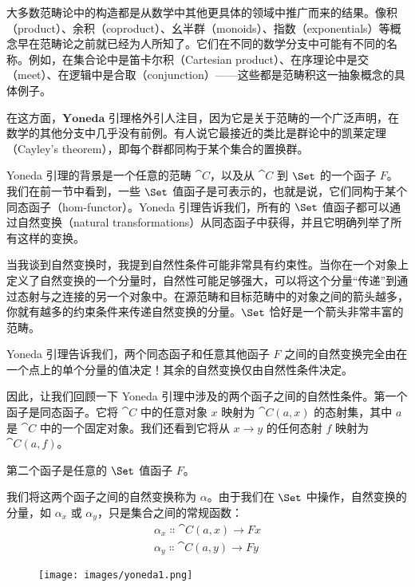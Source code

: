 
\lettrine[lhang=0.17]{大}{多数范畴论中的构造}都是从数学中其他更具体的领域中推广而来的结果。像积（product）、余积（coproduct）、幺半群（monoids）、指数（exponentials）等概念早在范畴论之前就已经为人所知了。它们在不同的数学分支中可能有不同的名称。例如，在集合论中是笛卡尔积（Cartesian product）、在序理论中是交（meet）、在逻辑中是合取（conjunction）——这些都是范畴积这一抽象概念的具体例子。

在这方面，$\textbf{Yoneda 引理}$格外引人注目，因为它是关于范畴的一个广泛声明，在数学的其他分支中几乎没有前例。有人说它最接近的类比是群论中的凯莱定理（Cayley’s theorem），即每个群都同构于某个集合的置换群。

Yoneda 引理的背景是一个任意的范畴 $\cat{C}$，以及从 $\cat{C}$ 到 $\Set$ 的一个函子 $F$。我们在前一节中看到，一些 $\Set$ 值函子是可表示的，也就是说，它们同构于某个同态函子（hom-functor）。Yoneda 引理告诉我们，所有的 $\Set$ 值函子都可以通过自然变换（natural transformations）从同态函子中获得，并且它明确列举了所有这样的变换。

当我谈到自然变换时，我提到自然性条件可能非常具有约束性。当你在一个对象上定义了自然变换的一个分量时，自然性可能足够强大，可以将这个分量“传递”到通过态射与之连接的另一个对象中。在源范畴和目标范畴中的对象之间的箭头越多，你就有越多的约束条件来传递自然变换的分量。$\Set$ 恰好是一个箭头非常丰富的范畴。

Yoneda 引理告诉我们，两个同态函子和任意其他函子 $F$ 之间的自然变换完全由在一个点上的单个分量的值决定！其余的自然变换仅由自然性条件决定。

因此，让我们回顾一下 Yoneda 引理中涉及的两个函子之间的自然性条件。第一个函子是同态函子。它将 $\cat{C}$ 中的任意对象 $x$ 映射为 $\cat{C}(a, x)$ 的态射集，其中 $a$ 是 $\cat{C}$ 中的一个固定对象。我们还看到它将从 $x \to y$ 的任何态射 $f$ 映射为 $\cat{C}(a, f)$。

第二个函子是任意的 $\Set$ 值函子 $F$。

我们将这两个函子之间的自然变换称为 $\alpha$。由于我们在 $\Set$ 中操作，自然变换的分量，如 $\alpha_x$ 或 $\alpha_y$，只是集合之间的常规函数：
\begin{gather*}
  \alpha_x \Colon \cat{C}(a, x) \to F x \\
  \alpha_y \Colon \cat{C}(a, y) \to F y
\end{gather*}

\begin{figure}[H]
  \centering
  \texttt{[image: images/yoneda1.png]}
\end{figure}

